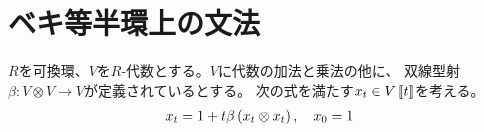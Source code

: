 \begingroup %
\newcommand{\bfg}{\mathbf{g}}
\newcommand{\calT}{\mathcal{T}}
{\setlength\arraycolsep{2pt}
%
\section{ベキ等半環上の文法}\label{s1:ベキ等半環上の文法} %
	\begin{todo}[一般化]\label{todo:一般化} %
		$R$を可換環、$V$を$R$-代数とする。$V$に代数の加法と乗法の他に、
		双線型射$\beta:V\otimes V\to V$が定義されているとする。
		次の式を満たす$x_t\in V\mathinner{[\![{t}]\!]}$を考える。
		\begin{equation*}\begin{split}
			x_t = 1 + t\beta\mathinner{({x_t\otimes x_t})},\quad x_0 = 1
		\end{split}\end{equation*}
	\end{todo} %
}

